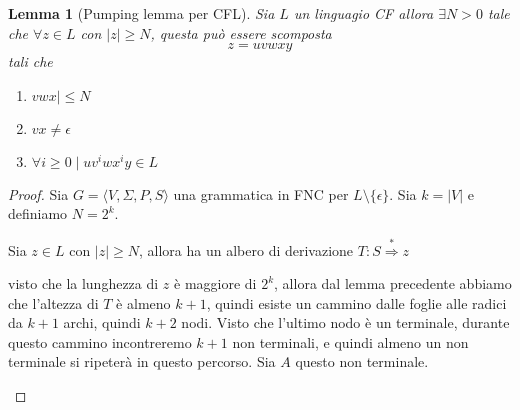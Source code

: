 \documentclass[12pt]{report}
\newtheorem{lemma}{Lemma}
\begin{document}
\begin{lemma}[Pumping lemma per CFL]
	Sia $L$ un linguagio CF allora $\exists N > 0$ tale che $\forall z \in L$ con $|z| \geq N$, questa può essere scomposta
	$$ z = uvwxy $$
	tali che
	\begin{enumerate}
		\item $vwx| \leq N $
		\item $vx \neq \epsilon $
		\item $\forall i \geq 0 \mid uv^i w x^i y \in L$
	\end{enumerate}
\end{lemma}
\begin{proof}
	Sia $G = \langle V, \Sigma, P, S \rangle$ una grammatica in FNC per $L \setminus \{ \epsilon \}$.
	Sia $k = | V | $ e definiamo $N = 2^k$.

	Sia $z \in L$ con $|z| \geq N$, allora ha un albero di derivazione $T : S \overset{*}{\Rightarrow} z$
	\begin{center}
	\end{center}
	visto che la lunghezza di $z$ è maggiore di $2^k$, allora dal lemma precedente abbiamo che l'altezza di $T$ è almeno $k + 1$, quindi esiste un cammino dalle foglie alle radici da $k + 1$ archi, quindi $k + 2$ nodi.
	Visto che l'ultimo nodo è un terminale, durante questo cammino incontreremo $k + 1$ non terminali, e quindi almeno un non terminale si ripeterà in questo percorso.
	Sia $A$ questo non terminale.
	\begin{figure}[H]
		\centering
		\begin{subfigure}{\textwidth}
			\centering
\end{subfigure}
\end{figure}
\end{proof}
\end{document}
